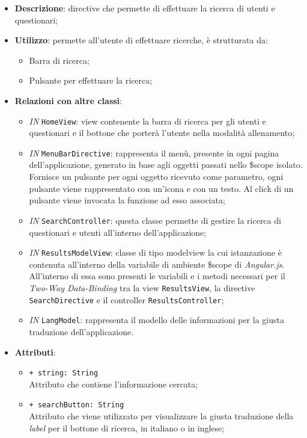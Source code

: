 \begin{itemize}
	\item \textbf{Descrizione}: directive che permette di effettuare la ricerca di utenti e questionari;
	\item \textbf{Utilizzo}: permette all'utente di effettuare ricerche, è strutturata da:
	\begin{itemize}
		\item Barra di ricerca;
		\item Pulsante per effettuare la ricerca;
	\end{itemize}
	\item \textbf{Relazioni con altre classi}:
	\begin{itemize}
			\item \textit{IN} \texttt{HomeView}: view contenente la barra di ricerca per gli utenti e questionari e il bottone che porterà l'utente nella modalità allenamento;
		\item \textit{IN} \texttt{MenuBarDirective}: rappresenta il menù, presente in ogni pagina dell'applicazione, generato in base agli oggetti passati nello \$scope isolato. Fornisce un pulsante per ogni oggetto ricevuto come parametro, ogni pulsante viene rappresentato con un’icona e con un testo. Al click di un pulsante viene invocata la funzione ad esso associata;
		\item \textit{IN} \texttt{SearchController}: questa classe permette di gestire la ricerca di questionari e utenti all'interno dell'applicazione;
		\item \textit{IN} \texttt{ResultsModelView}: classe di tipo modelview la cui istanzazione è contenuta all'interno della variabile di ambiente \$scope di \textit{Angular.js}. All'interno di essa sono presenti le variabili e i metodi necessari per il \textit{Two-Way Data-Binding} tra la view \texttt{ResultsView}, la directive \texttt{SearchDirective} e il controller \texttt{ResultsController};
		\item \textit{IN} \texttt{LangModel}: rappresenta il modello delle informazioni per la giusta traduzione dell'applicazione.
	\end{itemize}
	\item \textbf{Attributi}:
	\begin{itemize}
		\item \texttt{+ string: String} \\ Attributo che contiene l'informazione cercata;
		\item \texttt{+ searchButton: String} \\ Attributo che viene utilizzato per visualizzare la giusta traduzione della \textit{label} per il bottone di ricerca, in italiano o in inglese;

\end{itemize}
\end{itemize}
